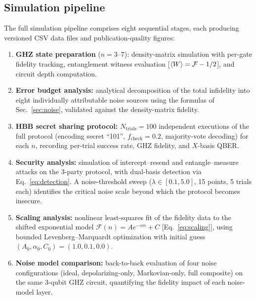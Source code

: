 \documentclass[aip, amsmath, amssymb, preprint, longbibliography]{revtex4-2}
\newcommand{\fid}{\mathcal{F}}
\begin{document}
\subsection{Simulation pipeline}\label{sec:pipeline}

The full simulation pipeline comprises eight sequential stages, each
producing versioned CSV data files and publication-quality figures:

\begin{enumerate}
\item \textbf{GHZ state preparation} ($n=3$--$7$):
      density-matrix simulation with per-gate fidelity tracking, entanglement
      witness evaluation [$\braket{W}=\fid-1/2$], and circuit depth
      computation.

\item \textbf{Error budget analysis:}
      analytical decomposition of the total infidelity into eight
      individually attributable noise sources using the formulas of
      Sec.~\ref{sec:noise}, validated against the density-matrix
      fidelity.

\item \textbf{HBB secret sharing protocol:}
      $N_{\text{trials}}=100$ independent executions of the full
      protocol (encoding secret ``101'', $f_{\text{check}}=0.2$,
      majority-vote decoding) for each $n$, recording per-trial
      success rate, GHZ fidelity, and $X$-basis QBER.

\item \textbf{Security analysis:}
      simulation of intercept--resend and entangle--measure attacks
      on the 3-party protocol, with dual-basis detection via
      Eq.~\eqref{eq:detection}. A noise-threshold sweep
      ($\lambda\in[0.1,5.0]$, 15 points, 5 trials each) identifies the
      critical noise scale beyond which the protocol becomes insecure.

\item \textbf{Scaling analysis:}
      nonlinear least-squares fit of the fidelity data to the shifted
      exponential model $\fid(n)=Ae^{-\alpha n}+C$
      [Eq.~\eqref{eq:scaling}], using bounded Levenberg--Marquardt
      optimization with initial guess $(A_0,\alpha_0,C_0)=(1.0,0.1,0.0)$.

\item \textbf{Noise model comparison:}
      back-to-back evaluation of four noise configurations (ideal,
      depolarizing-only, Markovian-only, full composite) on the same
      3-qubit GHZ circuit, quantifying the fidelity impact of each
      noise-model layer.


\end{enumerate}
\end{document}
